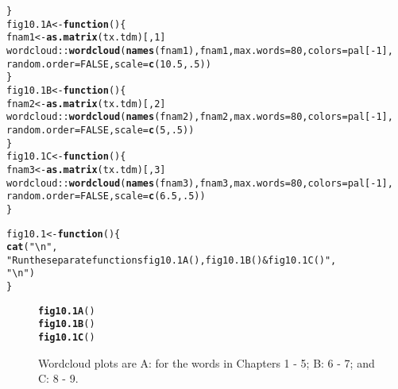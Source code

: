 \documentclass[12pt, a4paper,  BCOR=8.25mm, DIV=15]{scrartcl}\usepackage[]{graphicx}\usepackage[]{color}
\makeatletter
\newcommand{\hlnum}[1]{\textcolor[rgb]{0.686,0.059,0.569}{#1}}%
\newcommand{\hlstr}[1]{\textcolor[rgb]{0.192,0.494,0.8}{#1}}%
\newcommand{\hlopt}[1]{\textcolor[rgb]{0,0,0}{#1}}%
\newcommand{\hlstd}[1]{\textcolor[rgb]{0.345,0.345,0.345}{#1}}%
\newcommand{\hlkwa}[1]{\textcolor[rgb]{0.161,0.373,0.58}{\textbf{#1}}}%
\newcommand{\hlkwb}[1]{\textcolor[rgb]{0.69,0.353,0.396}{#1}}%
\newcommand{\hlkwc}[1]{\textcolor[rgb]{0.333,0.667,0.333}{#1}}%
\newcommand{\hlkwd}[1]{\textcolor[rgb]{0.737,0.353,0.396}{\textbf{#1}}}%
\newenvironment{kframe}{%
 \def\at@end@of@kframe{}%
 \ifinner\ifhmode%
  \def\at@end@of@kframe{\end{minipage}}%
  \begin{minipage}{\columnwidth}%
 \fi\fi%
 \def\FrameCommand##1{\hskip\@totalleftmargin \hskip-\fboxsep
 \colorbox{shadecolor}{##1}\hskip-\fboxsep
     \hskip-\linewidth \hskip-\@totalleftmargin \hskip\columnwidth}%
 \MakeFramed {\advance\hsize-\width
   \@totalleftmargin\z@ \linewidth\hsize
   \@setminipage}}%
 {\par\unskip\endMakeFramed%
 \at@end@of@kframe}
\newenvironment{knitrout}{}{} %
\makeatother
\begin{document}
\begin{knitrout}
\begin{kframe}
\begin{alltt}
\hlstd{\}}
\hlstd{fig10.1A} \hlkwb{<-} \hlkwa{function}\hlstd{()\{}
\hlstd{fnam1} \hlkwb{<-} \hlkwd{as.matrix}\hlstd{(tx.tdm)[,}\hlnum{1}\hlstd{]}
\hlstd{wordcloud}\hlopt{::}\hlkwd{wordcloud}\hlstd{(}\hlkwd{names}\hlstd{(fnam1), fnam1,} \hlkwc{max.words}\hlstd{=}\hlnum{80}\hlstd{,} \hlkwc{colors}\hlstd{=pal[}\hlopt{-}\hlnum{1}\hlstd{],}
          \hlkwc{random.order}\hlstd{=}\hlnum{FALSE}\hlstd{,} \hlkwc{scale}\hlstd{=}\hlkwd{c}\hlstd{(}\hlnum{10.5}\hlstd{,}\hlnum{.5}\hlstd{))}
\hlstd{\}}
\hlstd{fig10.1B} \hlkwb{<-} \hlkwa{function}\hlstd{()\{}
\hlstd{fnam2} \hlkwb{<-} \hlkwd{as.matrix}\hlstd{(tx.tdm)[,}\hlnum{2}\hlstd{]}
\hlstd{wordcloud}\hlopt{::}\hlkwd{wordcloud}\hlstd{(}\hlkwd{names}\hlstd{(fnam2), fnam2,} \hlkwc{max.words}\hlstd{=}\hlnum{80}\hlstd{,} \hlkwc{colors}\hlstd{=pal[}\hlopt{-}\hlnum{1}\hlstd{],}
          \hlkwc{random.order}\hlstd{=}\hlnum{FALSE}\hlstd{,} \hlkwc{scale}\hlstd{=}\hlkwd{c}\hlstd{(}\hlnum{5}\hlstd{,}\hlnum{.5}\hlstd{))}
\hlstd{\}}
\hlstd{fig10.1C} \hlkwb{<-} \hlkwa{function}\hlstd{()\{}
\hlstd{fnam3} \hlkwb{<-} \hlkwd{as.matrix}\hlstd{(tx.tdm)[,}\hlnum{3}\hlstd{]}
\hlstd{wordcloud}\hlopt{::}\hlkwd{wordcloud}\hlstd{(}\hlkwd{names}\hlstd{(fnam3), fnam3,} \hlkwc{max.words}\hlstd{=}\hlnum{80}\hlstd{,} \hlkwc{colors}\hlstd{=pal[}\hlopt{-}\hlnum{1}\hlstd{],}
          \hlkwc{random.order}\hlstd{=}\hlnum{FALSE}\hlstd{,} \hlkwc{scale}\hlstd{=}\hlkwd{c}\hlstd{(}\hlnum{6.5}\hlstd{,}\hlnum{.5}\hlstd{))}
\hlstd{\}}
\end{alltt}
\end{kframe}
\end{knitrout}

\begin{knitrout}
\color{fgcolor}\begin{kframe}
\begin{alltt}
\hlstd{fig10.1} \hlkwb{<-} \hlkwa{function}\hlstd{()\{}
    \hlkwd{cat}\hlstd{(}\hlstr{"\textbackslash{}n"}\hlstd{,}
        \hlstr{"Run the separate functions fig10.1A(), fig10.1B() & fig10.1C()"}\hlstd{,}
        \hlstr{"\textbackslash{}n"}\hlstd{)}
\hlstd{\}}
\end{alltt}
\end{kframe}
\end{knitrout}

\begin{figure}
\begin{knitrout}
\color{fgcolor}\begin{kframe}
\begin{alltt}
\hlkwd{fig10.1A}\hlstd{()}
\hlkwd{fig10.1B}\hlstd{()}
\hlkwd{fig10.1C}\hlstd{()}
\end{alltt}
\end{kframe}
\end{knitrout}

\caption{Wordcloud plots are A: for the words in Chapters 1 - 5; B: 6 -
  7; and C: 8 - 9.\label{fig:wc}}
\end{figure}
\end{document}
